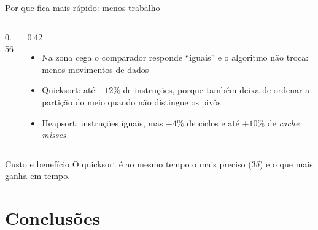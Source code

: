 \documentclass[aspectratio=169,10pt]{beamer}
\begin{document}
\begin{frame}{Por que fica mais rápido: menos trabalho}
  \begin{columns}[c]
    \begin{column}{0.56\textwidth}
    \end{column}
    \begin{column}{0.42\textwidth}
      \begin{itemize}
        \item Na zona cega o comparador responde ``iguais'' e o algoritmo
              \alert{não troca}: menos movimentos de dados
        \item Quicksort: até $-12\%$ de instruções, porque também deixa de ordenar
              a partição do meio quando não distingue os pivôs
        \item Heapsort: instruções iguais, mas $+4\%$ de ciclos e até $+10\%$
              de \emph{cache misses}
      \end{itemize}
    \end{column}
  \end{columns}
  \vspace{0.4em}
  \begin{alertblock}{Custo e benefício}
    O quicksort é ao mesmo tempo o mais preciso ($3\delta$) e o que mais ganha em tempo.
  \end{alertblock}
\end{frame}

\section{Conclusões}
\end{document}
